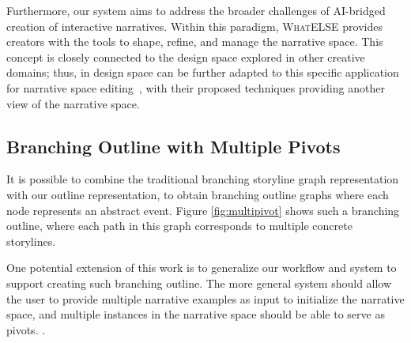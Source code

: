 Furthermore, our system aims to address the broader challenges of AI-bridged creation of interactive narratives. Within this paradigm, \textsc{WhatELSE} provides creators with the tools to shape, refine, and manage the narrative space. This concept is closely connected to the design space explored in other creative domains; thus,  in design space can be further adapted to this specific application for narrative space editing~\cite{ez2022design,suh2024luminate}, with their proposed techniques providing another view of the narrative space.





\subsection{Branching Outline with Multiple Pivots}

It is possible to combine the traditional branching storyline graph representation with our outline representation, to obtain branching outline graphs where each node represents an abstract event. Figure \ref{fig:multipivot} shows such a branching outline, where each path in this graph corresponds to multiple concrete storylines.

One potential extension of this work is to generalize our workflow and system to support creating such branching outline. The more general system should allow the user to provide multiple narrative examples as input to initialize the narrative space, and multiple instances in the narrative space should be able to serve as pivots. 
.


